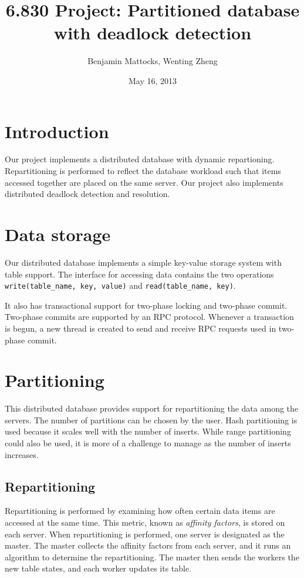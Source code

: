 \documentclass[a4paper, 10pt, notitlepage]{report}
\title{6.830 Project: Partitioned database with deadlock detection}
\author{Benjamin Mattocks, Wenting Zheng}
\date{May 16, 2013} %
\begin{document}
\maketitle
\thispagestyle{empty}
\newpage


\section*{Introduction}
Our project implements a distributed database with dynamic repartioning. Repartitioning is performed to reflect the database workload such that items accessed together are placed on the same server. Our project also implements distributed deadlock detection and resolution.

\section*{Data storage}
Our distributed database implements a simple key-value storage system with table support. The interface for accessing data contains the two operations \texttt{write(table\_name, key, value)} and \texttt{read(table\_name, key)}.

It also has transactional support for two-phase locking and two-phase commit. Two-phase commits are supported by an RPC protocol. Whenever a transaction is begun, a new thread is created to send and receive RPC requests used in two-phase commit.

\section*{Partitioning}
This distributed database provides support for repartitioning the data among the servers. The number of partitions can be chosen by the user.  Hash partitioning is used because it scales well with the number of inserts. While range partitioning could also be used, it is more of a challenge to manage as the number of inserts increases.

\subsection*{Repartitioning}
Repartitioning is performed by examining how often certain data items are accessed at the same time. This metric, known as \textit{affinity factors}, is stored on each server. When repartitioning is performed, one server is designated as the master. The master collects the affinity factors from each server, and it runs an algorithm to determine the repartitioning. The master then sends the workers the new table states, and each worker updates its table.
\end{document}

